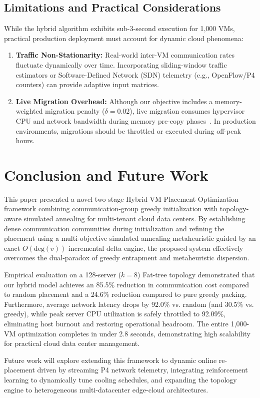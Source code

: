 \documentclass[conference]{IEEEtran}
\begin{document}
\subsection{Limitations and Practical Considerations}
While the hybrid algorithm exhibits sub-3-second execution for 1,000 VMs, practical production deployment must account for dynamic cloud phenomena:
\begin{enumerate}
    \item \textbf{Traffic Non-Stationarity:} Real-world inter-VM communication rates fluctuate dynamically over time. Incorporating sliding-window traffic estimators or Software-Defined Network (SDN) telemetry (e.g., OpenFlow/P4 counters) can provide adaptive input matrices.
    \item \textbf{Live Migration Overhead:} Although our objective includes a memory-weighted migration penalty ($\delta = 0.02$), live migration consumes hypervisor CPU and network bandwidth during memory pre-copy phases~\cite{shrivastava2011application}. In production environments, migrations should be throttled or executed during off-peak hours.
\end{enumerate}

\section{Conclusion and Future Work}
\label{sec:conclusion}
This paper presented a novel two-stage Hybrid VM Placement Optimization framework combining communication-group greedy initialization with topology-aware simulated annealing for multi-tenant cloud data centers. By establishing dense communication communities during initialization and refining the placement using a multi-objective simulated annealing metaheuristic guided by an exact $O(\mathrm{deg}(v))$ incremental delta engine, the proposed system effectively overcomes the dual-paradox of greedy entrapment and metaheuristic dispersion.

Empirical evaluation on a 128-server ($k=8$) Fat-tree topology demonstrated that our hybrid model achieves an 85.5\% reduction in communication cost compared to random placement and a 24.6\% reduction compared to pure greedy packing. Furthermore, average network latency drops by 92.0\% vs. random (and 30.5\% vs. greedy), while peak server CPU utilization is safely throttled to 92.09\%, eliminating host burnout and restoring operational headroom. The entire 1,000-VM optimization completes in under 2.8 seconds, demonstrating high scalability for practical cloud data center management.

Future work will explore extending this framework to dynamic online re-placement driven by streaming P4 network telemetry, integrating reinforcement learning to dynamically tune cooling schedules, and expanding the topology engine to heterogeneous multi-datacenter edge-cloud architectures.



\end{document}
